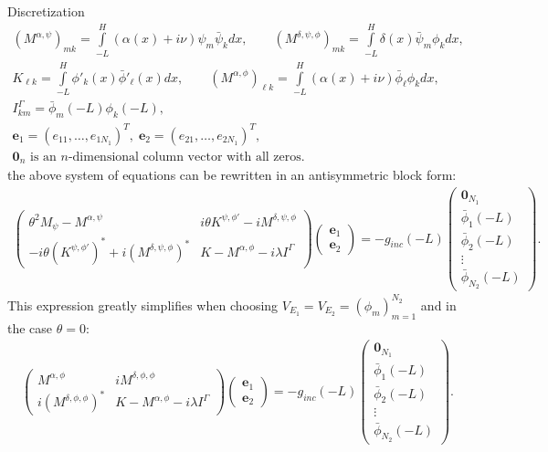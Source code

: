 \documentclass[11pt]{amsart}
\begin{document}
\begin{subsection}{Discretization}
\begin{align*}
\left(M^{\alpha,\psi}\right)_{mk}=\int\limits_{-L}^{H}(\alpha(x)+i\nu)\psi_{m}\bar{\psi}_{k}dx, \qquad \left(M^{\delta,\psi,\phi}\right)_{mk}=\int\limits_{-L}^{H}\delta(x)\bar{\psi}_{m}\phi_{k}dx,\\
K_{\ell k}=\int\limits_{-L}^{H}\phi'_{k}(x)\bar{\phi}'_{\ell}(x)dx,\qquad \left(M^{\alpha,\phi}\right)_{\ell k}=\int\limits_{-L}^{H}(\alpha(x)+i\nu)\bar{\phi}_{\ell}\phi_{k}dx,\\
I_{km}^{\Gamma}=\bar{\phi}_{m}(-L)\phi_{k}(-L),\\
\boldsymbol{e}_{1}=\left(e_{11},\ldots,e_{1 N_{1}}\right)^{T},\; \boldsymbol{e}_{2}=\left(e_{21},\ldots,e_{2 N_{1}}\right)^{T},\\
\boldsymbol{0}_{n} \text{ is an $n$-dimensional column vector with all zeros}.
\end{align*}
the above system of equations can be rewritten in an antisymmetric block form:
\begin{align*}
\left(\begin{matrix}
\theta^2 M_{\psi}-M^{\alpha,\psi} & i\theta K^{\psi,\phi'}-i M^{\delta,\psi,\phi} \\
-i\theta (K^{\psi,\phi'})^{*}+i (M^{\delta,\psi,\phi})^{*} & K-M^{\alpha,\phi}-i\lambda I^{\Gamma}
\end{matrix}\right)
\left(
\begin{matrix}
\boldsymbol{e}_1\\
\boldsymbol{e}_2
\end{matrix}
\right)=-g_{inc}(-L)
\left(
\begin{matrix}
\boldsymbol{0}_{N_{1}}\\
\bar{\phi}_{1}(-L)\\
\bar{\phi}_{2}(-L)\\
\vdots\\
\bar{\phi}_{N_{2}}(-L)
\end{matrix}
\right).
\end{align*}
This expression greatly simplifies when choosing $V_{E_{1}}=V_{E_{2}}=\left(\phi_{m}\right)_{m=1}^{N_{2}}$ and in the case $\theta=0$:
\begin{align}
\label{eq:simple_system}
\left(\begin{matrix}
M^{\alpha,\phi} & i M^{\delta,\phi,\phi} \\
i (M^{\delta,\phi,\phi})^{*} & K-M^{\alpha,\phi}-i\lambda I^{\Gamma}
\end{matrix}\right)
\left(
\begin{matrix}
\boldsymbol{e}_1\\ 
\boldsymbol{e}_2
\end{matrix}
\right)=-g_{inc}(-L)
\left(
\begin{matrix}
\boldsymbol{0}_{N_{1}}\\
\bar{\phi}_{1}(-L)\\
\bar{\phi}_{2}(-L)\\
\vdots\\
\bar{\phi}_{N_{2}}(-L)
\end{matrix}
\right).
\end{align}
\end{subsection}
\end{document}

